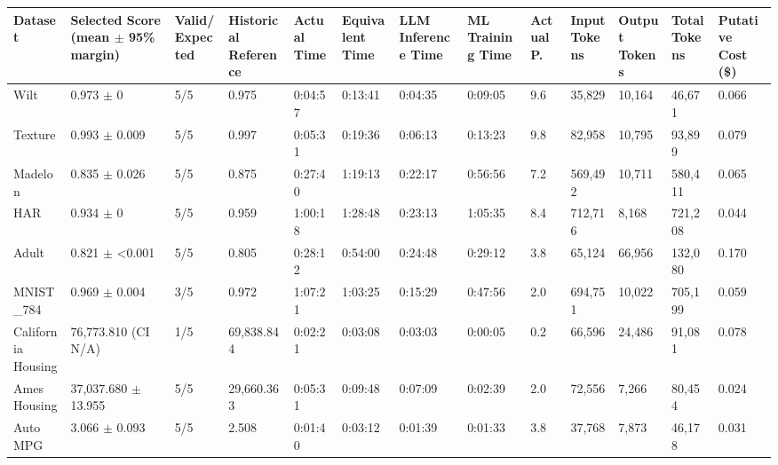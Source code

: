 \begin{tabular}{lllllllllllll}
\hline
Dataset & Selected Score (mean \ensuremath{\pm} 95\% margin) & Valid/Expected & Historical Reference & Actual Time & Equivalent Time & LLM Inference Time & ML Training Time & Actual P. & Input Tokens & Output Tokens & Total Tokens & Putative Cost (\$) \\
\hline
Wilt & 0.973 \ensuremath{\pm} 0 & 5/5 & 0.975 & 0:04:57 & 0:13:41 & 0:04:35 & 0:09:05 & 9.6 & 35,829 & 10,164 & 46,671 & 0.066 \\
Texture & 0.993 \ensuremath{\pm} 0.009 & 5/5 & 0.997 & 0:05:31 & 0:19:36 & 0:06:13 & 0:13:23 & 9.8 & 82,958 & 10,795 & 93,899 & 0.079 \\
Madelon & 0.835 \ensuremath{\pm} 0.026 & 5/5 & 0.875 & 0:27:40 & 1:19:13 & 0:22:17 & 0:56:56 & 7.2 & 569,492 & 10,711 & 580,411 & 0.065 \\
HAR & 0.934 \ensuremath{\pm} 0 & 5/5 & 0.959 & 1:00:18 & 1:28:48 & 0:23:13 & 1:05:35 & 8.4 & 712,716 & 8,168 & 721,208 & 0.044 \\
Adult & 0.821 \ensuremath{\pm} \textless{}0.001 & 5/5 & 0.805 & 0:28:12 & 0:54:00 & 0:24:48 & 0:29:12 & 3.8 & 65,124 & 66,956 & 132,080 & 0.170 \\
MNIST\_784 & 0.969 \ensuremath{\pm} 0.004 & 3/5 & 0.972 & 1:07:21 & 1:03:25 & 0:15:29 & 0:47:56 & 2.0 & 694,751 & 10,022 & 705,199 & 0.059 \\
California Housing & 76,773.810 (CI N/A) & 1/5 & 69,838.844 & 0:02:21 & 0:03:08 & 0:03:03 & 0:00:05 & 0.2 & 66,596 & 24,486 & 91,081 & 0.078 \\
Ames Housing & 37,037.680 \ensuremath{\pm} 13.955 & 5/5 & 29,660.363 & 0:05:31 & 0:09:48 & 0:07:09 & 0:02:39 & 2.0 & 72,556 & 7,266 & 80,454 & 0.024 \\
Auto MPG & 3.066 \ensuremath{\pm} 0.093 & 5/5 & 2.508 & 0:01:40 & 0:03:12 & 0:01:39 & 0:01:33 & 3.8 & 37,768 & 7,873 & 46,178 & 0.031 \\
\hline
\end{tabular}
